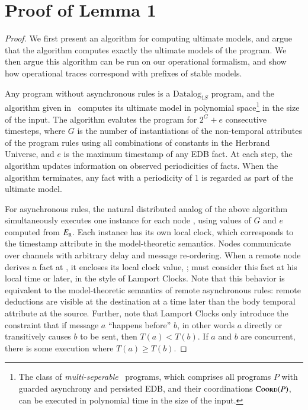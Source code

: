 \section{Proof of Lemma 1}
\begin{proof}
We first present an algorithm for computing ultimate models, and argue that the algorithm computes exactly the ultimate models of the \lang program.  We then argue this algorithm can be run on our operational formalism, and show how operational traces correspond with prefixes of stable models.

Any \lang program without asynchronous rules is a $\text{Datalog}_{1S}$ program, and the algorithm given in~\cite{tdd} computes its ultimate model in polynomial space\footnote{The class of {\em multi-seperable}~\cite{tdd-poly} \lang programs, which comprises all \lang programs $P$ with guarded asynchrony and persisted EDB, and their coordinations $\textsc{Coord}(P)$, can be executed in polynomial time in the size of the input.} in the size of the input.  The algorithm evalutes the program for $2^G + e$ consecutive timesteps, where $G$ is the number of instantiations of the non-temporal attributes of the program rules using all combinations of constants in the Herbrand Universe, and $e$ is the maximum timestamp of any EDB fact.  At each step, the algorithm updates information on observed periodicities of facts.  When the algorithm terminates, any fact with a periodicity of 1 is regarded as part of the ultimate model.

For asynchronous rules, the natural distributed analog of the above algorithm simultaneously executes one instance for each node , using values of $G$ and $e$ computed from $E_{\text{\dedalus{{\scriptsize n}}}}$.  Each instance has its own local clock, which corresponds to the timestamp attribute in the model-theoretic semantics.  Nodes communicate over channels with arbitrary delay and message re-ordering.  When a remote node  derives a fact at , it encloses its local clock value, ;  must consider this fact at his local time  or later, in the style of Lamport Clocks.  Note that this behavior is equivalent to the model-theoretic semantics of remote asynchronous rules: remote deductions are visible at the destination at a time later than the body temporal attribute at the source.  Further, note that Lamport Clocks only introduce the constraint that if message $a$ ``happens before'' $b$, in other words $a$ directly or transitively causes $b$ to be sent, then $T(a) < T(b)$.  If $a$ and $b$ are concurrent, there is some execution where $T(a) \geq T(b)$.


\end{proof}
